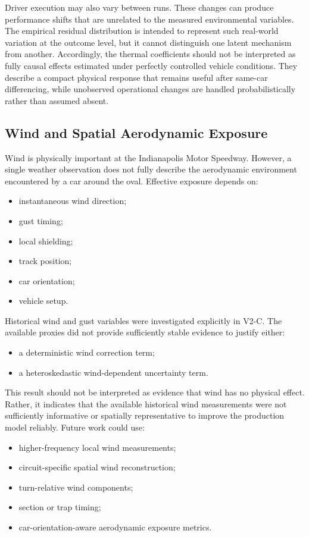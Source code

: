 Driver execution may also vary between runs. These changes can produce performance shifts that are unrelated to the measured environmental variables. The empirical residual distribution is intended to represent such real-world variation at the outcome level, but it cannot distinguish one latent mechanism from another. Accordingly, the thermal coefficients should not be interpreted as fully causal effects estimated under perfectly controlled vehicle conditions. They describe a compact physical response that remains useful after same-car differencing, while unobserved operational changes are handled probabilistically rather than assumed absent.

\subsection{Wind and Spatial Aerodynamic Exposure}
Wind is physically important at the Indianapolis Motor Speedway. However, a single weather observation does not fully describe the aerodynamic environment encountered by a car around the oval. Effective exposure depends on:

\begin{itemize}
\item instantaneous wind direction;
\item gust timing;
\item local shielding;
\item track position;
\item car orientation;
\item vehicle setup.
\end{itemize}

Historical wind and gust variables were investigated explicitly in V2-C. The available proxies did not provide sufficiently stable evidence to justify either:

\begin{itemize}
\item a deterministic wind correction term;
\item a heteroskedastic wind-dependent uncertainty term.
\end{itemize}

This result should not be interpreted as evidence that wind has no physical effect. Rather, it indicates that the available historical wind measurements were not sufficiently informative or spatially representative to improve the production model reliably. Future work could use:

\begin{itemize}
\item higher-frequency local wind measurements;
\item circuit-specific spatial wind reconstruction;
\item turn-relative wind components;
\item section or trap timing;
\item car-orientation-aware aerodynamic exposure metrics.
\end{itemize}

